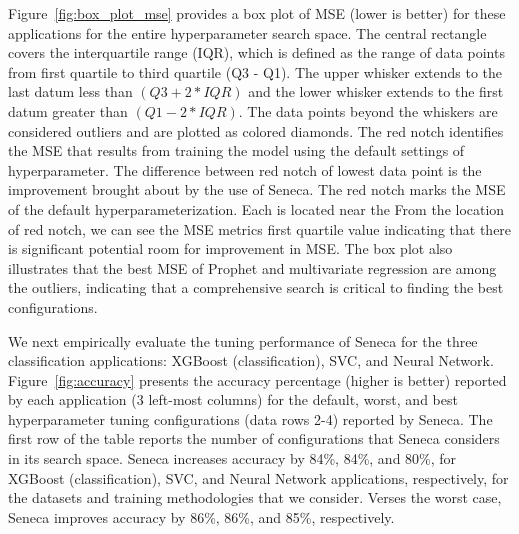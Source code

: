 Figure~\ref{fig:box_plot_mse} provides a box plot of MSE (lower is better)
for these applications 
for the entire hyperparameter 
search space. The central rectangle covers the interquartile range (IQR), 
which is defined as the range of data 
points from first quartile to third quartile (Q3 - Q1). 
The upper whisker extends to the last datum less 
than \texttt{$(Q3 + 2 * IQR)$} and the lower whisker extends to the first datum greater 
than \texttt{$(Q1 - 2 * IQR)$}. The data points beyond the whiskers are considered outliers 
and are plotted as colored diamonds. The red notch identifies the MSE that results from training 
the model using the default settings of hyperparameter. 
The difference between red notch of lowest data 
point is the improvement brought about by the use of Seneca. 
The red notch marks the MSE of the default hyperparameterization.
Each is located near the 
From the location of red notch, we can see the MSE metrics 
first quartile value indicating that there is significant 
potential room for improvement in MSE. The box plot also illustrates 
that the best MSE of Prophet and multivariate regression are among the outliers, 
indicating that a comprehensive search is critical to finding the best configurations. 

We next empirically evaluate the tuning performance of Seneca for the three
classification applications: XGBoost (classification), SVC, and Neural Network.
Figure~\ref{fig:accuracy} presents the accuracy percentage (higher is better) 
reported by each application (3 left-most columns) 
for the default, worst, and best hyperparameter tuning 
configurations (data rows 2-4) reported by Seneca.  
The first row of the table
reports the number of configurations that Seneca considers in its search space.
Seneca increases accuracy by 84\%, 84\%, and 80\%, for XGBoost (classification), 
SVC, and Neural Network applications,
respectively, for the datasets and training methodologies that we consider.
Verses the worst case, Seneca improves accuracy by 86\%, 86\%, and 85\%, respectively.


